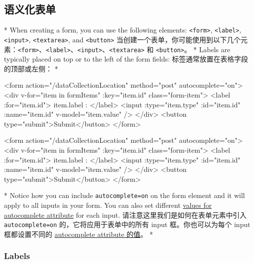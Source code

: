 \begin{paracol}{2}
\subsection{语义化表单}
\switchcolumn[0]*%
When creating a form, you can use the following elements:
\texttt{\textless{}form\textgreater{}},
\texttt{\textless{}label\textgreater{}},
\texttt{\textless{}input\textgreater{}},
\texttt{\textless{}textarea\textgreater{}}, and
\texttt{\textless{}button\textgreater{}}
\switchcolumn
当创建一个表单，你可能使用到以下几个元素：\texttt{\textless{}form\textgreater{}}、\texttt{\textless{}label\textgreater{}}、\texttt{\textless{}input\textgreater{}}、\texttt{\textless{}textarea\textgreater{}}
和 \texttt{\textless{}button\textgreater{}}。
\switchcolumn[0]*%
Labels are typically placed on top or to the left of the form fields:
\switchcolumn
标签通常放置在表格字段的顶部或左侧：
\switchcolumn[0]*%
\begin{codeHtml}
<form action="/dataCollectionLocation" method="post" autocomplete="on">
  <div v-for="item in formItems" :key="item.id" class="form-item">
    <label :for="item.id">{{ item.label }}: </label>
    <input
      :type="item.type"
      :id="item.id"
      :name="item.id"
      v-model="item.value"
    />
  </div>
  <button type="submit">Submit</button>
</form>
\end{codeHtml}
\switchcolumn
\begin{codeHtml}
<form action="/dataCollectionLocation" method="post" autocomplete="on">
  <div v-for="item in formItems" :key="item.id" class="form-item">
    <label :for="item.id">{{ item.label }}: </label>
    <input
      :type="item.type"
      :id="item.id"
      :name="item.id"
      v-model="item.value"
    />
  </div>
  <button type="submit">Submit</button>
</form>
\end{codeHtml}
\switchcolumn[0]*%
Notice how you can include
\texttt{autocomplete=\textquotesingle{}on\textquotesingle{}} on the form
element and it will apply to all inputs in your form. You can also set
different
\href{https://developer.mozilla.org/en-US/docs/Web/HTML/Attributes/autocomplete}{values
for autocomplete attribute} for each input.
\switchcolumn
请注意这里我们是如何在表单元素中引入
\texttt{autocomplete=\textquotesingle{}on\textquotesingle{}}
的，它将应用于表单中的所有 input 框。你也可以为每个 input 框都设置不同的
\href{https://developer.mozilla.org/en-US/docs/Web/HTML/Attributes/autocomplete}{autocomplete
attribute 的值}。
\switchcolumn[0]*%
\subsubsection{Labels}
\switchcolumn

\end{paracol}
